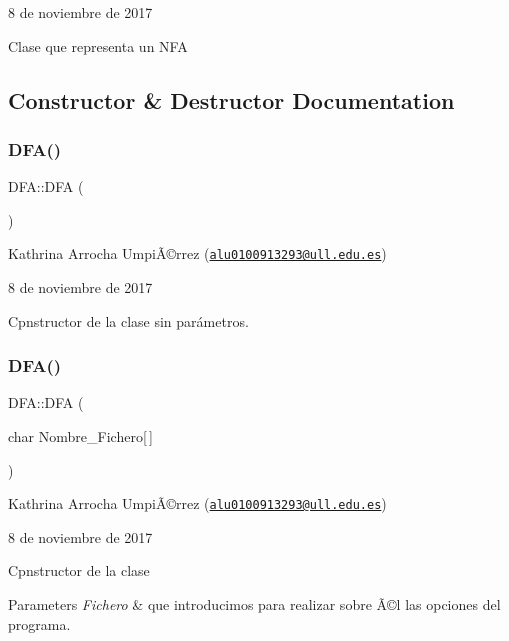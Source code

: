 8 de noviembre de 2017

Clase que representa un N\+FA 

\subsection{Constructor \& Destructor Documentation}
\mbox{\label{class_d_f_a_a0739bd751a325dd162604ed63fadea69}} 
\subsubsection{\texorpdfstring{D\+F\+A()}{DFA()}\hspace{0.1cm}{\footnotesize\ttfamily [1/2]}}
{\footnotesize\ttfamily D\+F\+A\+::\+D\+FA (\begin{DoxyParamCaption}{ }\end{DoxyParamCaption})}

Kathrina Arrocha UmpiÃ©rrez (\href{mailto:alu0100913293@ull.edu.es}{\tt alu0100913293@ull.\+edu.\+es})

8 de noviembre de 2017

Cpnstructor de la clase sin parámetros. \mbox{\label{class_d_f_a_a8ea9d7e634546e4138c011d5b4e47e3d}} 
\subsubsection{\texorpdfstring{D\+F\+A()}{DFA()}\hspace{0.1cm}{\footnotesize\ttfamily [2/2]}}
{\footnotesize\ttfamily D\+F\+A\+::\+D\+FA (\begin{DoxyParamCaption}\item[{char}]{Nombre\+\_\+\+Fichero\mbox{[}$\,$\mbox{]} }\end{DoxyParamCaption})}

Kathrina Arrocha UmpiÃ©rrez (\href{mailto:alu0100913293@ull.edu.es}{\tt alu0100913293@ull.\+edu.\+es})

8 de noviembre de 2017

Cpnstructor de la clase


\begin{DoxyParams}{Parameters}
{\em Fichero} & que introducimos para realizar sobre Ã©l las opciones del programa. \\
\hline
\end{DoxyParams}
\mbox{\label{class_d_f_a_aa6398a02d0f2d3a57cee0c7d8b3ec9e1}} 
